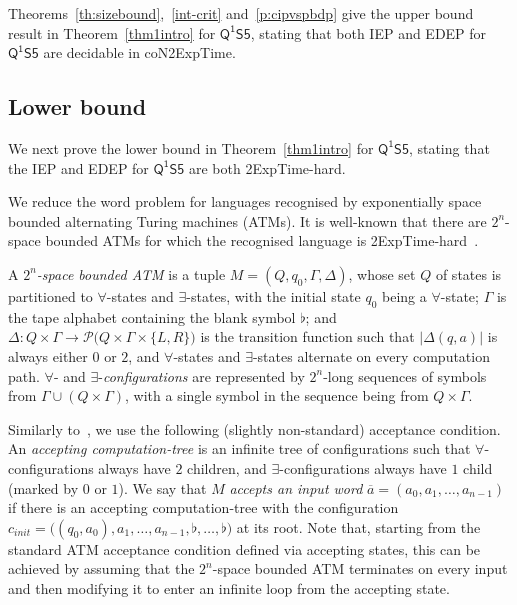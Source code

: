 \documentclass{lmcs} %
\theoremstyle{plain}\newtheorem{satz}[thm]{Satz} %
\newtheorem{definition}[theorem]{Definition}
\newcommand{\FOMS}{\ensuremath{\mathsf{Q^1S5}}}
\newcommand{\blank}{\flat}
\newcommand{\inpw}{\overline{a}}
\newcommand{\inpww}{a}
\newcommand{\cinit}{\config_{\textit{init}}}
\newcommand{\config}{c}
\begin{document}
Theorems~\ref{th:sizebound},~\ref{int-crit} and~\ref{p:cipvspbdp} give the upper bound result in Theorem~\ref{thm1intro} for $\FOMS$, stating that both IEP and EDEP for $\FOMS$ are decidable in {\sc coN2ExpTime}. 


\subsection{Lower bound}\label{ssec:s5xs5low}
We next prove the lower bound in Theorem~\ref{thm1intro} for $\FOMS$, stating that the IEP and EDEP for $\FOMS$ are both {\sc 2ExpTime}-hard. 

We reduce the word problem for languages recognised by exponentially space bounded alternating Turing machines (ATMs).
It is well-known that there are $2^n$-space bounded ATMs for which the recognised language is {\sc 2ExpTime}-hard~\cite{chandraAlternation1981}.
	
	A \emph{$2^n$-space bounded ATM} is a tuple $M=(Q,q_0,\Gamma,\Delta)$, 
	whose set $Q$ of states is partitioned to $\forall$-states and $\exists$-states, with the initial state $q_0$ being a $\forall$-state;
	$\Gamma$ is the tape alphabet containing the blank symbol $\blank$; 
	and 
	$
	\Delta \colon Q\times\Gamma\to\mathcal{P}\bigl(Q\times\Gamma\times\{L,R\}\bigr)
	$ 
	is the
	transition function such that $|\Delta(q,a)|$ is always either $0$ or $2$, and 
	$\forall$-states and $\exists$-states alternate on every computation path.
	$\forall$- and $\exists$-\emph{configurations} are represented by $2^n$-long sequences of symbols from $\Gamma\cup(Q\times\Gamma)$,
	with a single symbol in the sequence being from $Q\times\Gamma$.
	
	Similarly to~\cite{DBLP:conf/lics/JungW21},
	we use the following (slightly non-standard) acceptance condition.
	An \emph{accepting computation-tree} is an infinite tree of configurations such that $\forall$-configurations always have $2$ children, and $\exists$-configurations always have $1$ child (marked by $0$ or $1$).
	We say that $M$ \emph{accepts an input word} $\inpw=(\inpww_0,\inpww_1,\dots,\inpww_{n-1})$ if there
	is an accepting computation-tree with the configuration 
	$
	\cinit=\bigl((q_0,\inpww_0),\inpww_1,\dots,\inpww_{n-1},\blank,\dots,\blank\bigr)
	$
	at its root.
	Note that, starting from the standard ATM acceptance condition defined via accepting states, this can be achieved by assuming that the $2^n$-space bounded ATM terminates on every input and then modifying it to enter an infinite loop from the accepting state. 
	
\end{document}

